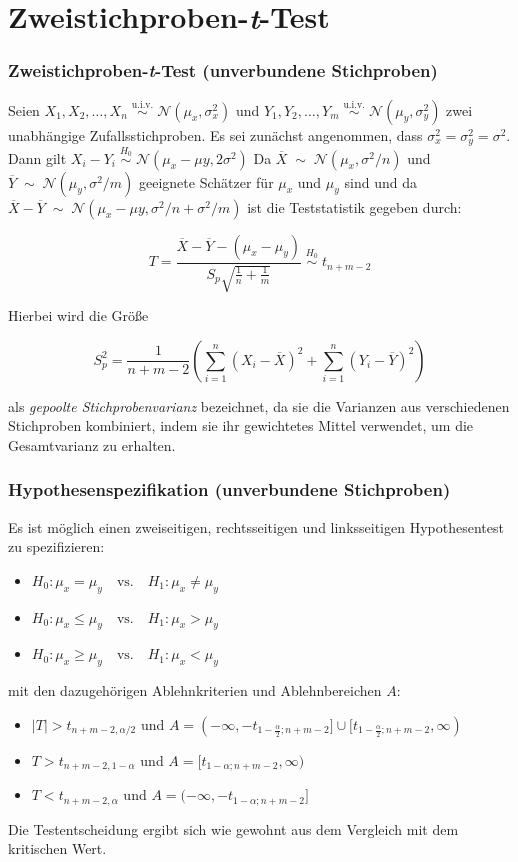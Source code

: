 \documentclass{beamer}
\begin{document}
\section{Zweistichproben-\textit{t}-Test}
\frame{\sectionpage}
\begin{frame}
\frametitle{Zweistichproben-\textit{t}-Test (unverbundene Stichproben)}
Seien $X_1, X_2, \dots, X_n  \; \stackrel{\mathrm{u.i.v.}}{\sim} \; \mathcal{N}(\mu_{x}, \sigma_{x}^2)$ und $Y_1, Y_2, \dots, Y_m  \; \stackrel{\mathrm{u.i.v.}}{\sim} \; \mathcal{N}(\mu_{y}, \sigma_{y}^2)$ zwei unabhängige Zufallsstichproben. Es sei zunächst angenommen, dass $\sigma^2_{x} = \sigma^2_{y} = \sigma^2$. Dann gilt $X_{i} -Y_{i}  \; \stackrel{H_0}{\sim} \; \mathcal{N}(\mu_{x} -\mu{y}, 2\sigma^2)$ Da $\overline{X}\; \sim \;\mathcal{N}(\mu_{x}, \sigma^2/n) $ und $\overline{Y}\; \sim \;\mathcal{N}(\mu_{y}, \sigma^2/m) $ geeignete Schätzer für $\mu_{x}$ und $\mu_{y}$ sind und da $\overline{X} -\overline{Y}\; \sim \;\mathcal{N}(\mu_{x}-\mu{y},\sigma^2/n + \sigma^2/m) $ ist die Teststatistik gegeben durch:

\[T=\frac{\overline{X}-\overline{Y} - (\mu_{x}-\mu_{y})}{S_{p}\sqrt{\frac{1}{n}+\frac{1}{m}}}  \; \stackrel{H_0}{\sim} \; t_{n+m-2}\]

Hierbei wird die Größe

\[S_{p}^2=\frac{1}{n+m-2}\left(\sum_{i=1}^n (X_i-\overline X )^2 + \sum_{i=1}^n (Y_i-\overline Y )^2  \right)\]

als \textit{gepoolte Stichprobenvarianz} bezeichnet, da sie die Varianzen aus verschiedenen Stichproben kombiniert, indem sie ihr gewichtetes Mittel  verwendet, um die Gesamtvarianz zu erhalten.
\end{frame}
\begin{frame}
\frametitle{Hypothesenspezifikation (unverbundene Stichproben)}

Es ist möglich einen zweiseitigen, rechtsseitigen und linksseitigen Hypothesentest zu spezifizieren:
\begin{itemize}
\item $H_0\colon \mu_{x} = \mu_{y} \quad \text{vs.} \quad H_1\colon \mu_{x} \ne \mu_{y}$
\item $H_0\colon \mu_{x} \leq \mu_{y} \quad \text{vs.} \quad H_1\colon \mu_{x} > \mu_{y}$
\item $H_0\colon \mu_{x} \geq \mu_{y} \quad \text{vs.} \quad H_1\colon \mu_{x} < \mu_{y}$
\end{itemize}
mit den dazugehörigen Ablehnkriterien und Ablehnbereichen $A$:
\begin{itemize}
\item $|T|>t_{n+m-2, \alpha/2}$ und $A =(-\infty,-t_{1-\frac{\alpha}2;n+m-2}]\cup [t_{1-\frac{\alpha}2;n+m-2},\infty)$
\item $T>t_{n+m-2, 1-\alpha}$ und $A = [t_{1-\alpha;n+m-2},\infty)$
\item $T < t_{n+m-2, \alpha}$ und $A = (-\infty,-t_{1-\alpha;n+m-2}]$
\end{itemize}
Die Testentscheidung ergibt sich wie gewohnt aus dem Vergleich mit dem kritischen Wert.
\end{frame}
\end{document}
